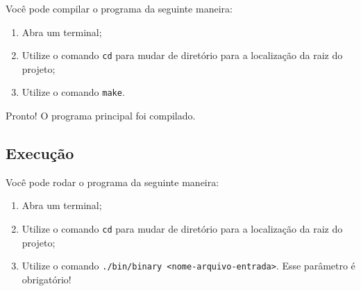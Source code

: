 \documentclass{article}
\def\code#1{\texttt{#1}}
\begin{document}
Você pode compilar o programa da seguinte maneira:

\begin{enumerate}
    \item Abra um terminal;
    \item Utilize o comando \code{cd} para mudar de diretório para a localização da raiz do projeto;
    \item Utilize o comando \code{make}. 
\end{enumerate}

Pronto! O programa principal foi compilado. 

\subsection*{Execução}

Você pode rodar o programa da seguinte maneira:

\begin{enumerate}
    \item Abra um terminal;
    \item Utilize o comando \code{cd} para mudar de diretório para a localização da raiz do projeto;
    \item Utilize o comando \code{./bin/binary <nome-arquivo-entrada>}. Esse parâmetro é obrigatório!
\end{enumerate}
\end{document}
